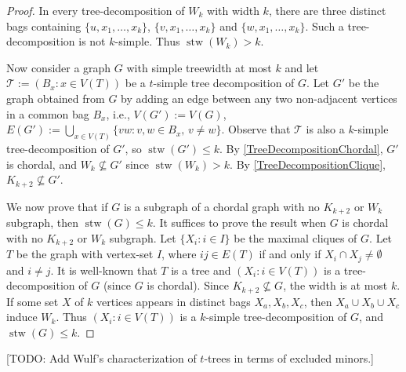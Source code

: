 \documentclass[kpfonts]{patmorin}
\DeclareMathOperator{\stw}{stw}
\theoremstyle{named}
\begin{document}
\begin{proof}
    In every tree-decomposition of $W_k$ with width $k$, there are three distinct bags containing $\{u,x_1,\dots,x_k\}$, $\{v,x_1,\dots,x_k\}$ and $\{w,x_1,\dots,x_k\}$. Such a tree-decomposition is not $k$-simple. Thus $\stw(W_k)>k$.

    Now consider a graph $G$ with simple treewidth at most $k$ and let $\mathcal{T}:=(B_x:x\in V(T))$ be a $t$-simple tree decomposition of $G$. Let $G'$ be the graph obtained from $G$ by adding an edge between any two non-adjacent vertices in a common bag $B_x$, i.e., $V(G'):=V(G)$, $E(G'):=\bigcup_{x\in V(T)}\{vw: v,w\in B_x,\, v\neq w\}$. Observe that $\mathcal{T}$ is also a $k$-simple tree-decomposition of $G'$, so $\stw(G')\leq k$. By \cref{TreeDecompositionChordal}, $G'$ is chordal, and $W_k\not\subseteq G'$ since $\stw(W_k)>k$. By \cref{TreeDecompositionClique}, $K_{k+2}\not\subseteq G'$.

    We now prove that if $G$ is a subgraph of a chordal graph with no $K_{k+2}$ or $W_k$ subgraph, then $\stw(G)\leq k$. It suffices to prove the result when $G$ is chordal with no $K_{k+2}$ or $W_k$ subgraph. Let $\{X_i:i\in I\}$ be the maximal cliques of $G$. Let $T$ be the graph with vertex-set $I$, where $ij\in E(T)$ if and only if $X_i\cap X_j\neq\emptyset$ and $i\neq j$. It is well-known that $T$ is a tree and $(X_i:i\in V(T))$ is a tree-decomposition of $G$ (since $G$ is chordal). Since $K_{k+2}\not\subseteq G$, the width is at most $k$. If some set $X$ of $k$ vertices appears in distinct bags $X_a,X_b,X_c$, then $X_a\cup X_b\cup X_c$ induce $W_k$. Thus $(X_i:i\in V(T))$ is a $k$-simple tree-decomposition of $G$, and $\stw(G)\leq k$.
\end{proof}

[TODO: Add Wulf's characterization of $t$-trees in terms of excluded minors.]




\end{document}
